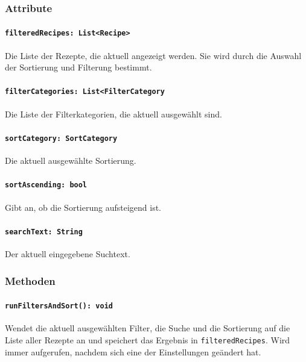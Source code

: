 \documentclass{entwurfsheft}
\begin{document}
\subsubsection*{Attribute}
\paragraph{\texttt{filteredRecipes: List<Recipe>}}
Die Liste der Rezepte, die aktuell angezeigt werden. Sie wird durch die Auswahl der Sortierung und Filterung bestimmt.
\paragraph{\texttt{filterCategories: List<FilterCategory}}
Die Liste der Filterkategorien, die aktuell ausgewählt sind.
\paragraph{\texttt{sortCategory: SortCategory}}
Die aktuell ausgewählte Sortierung.
\paragraph{\texttt{sortAscending: bool}}
Gibt an, ob die Sortierung aufsteigend ist.
\paragraph{\texttt{searchText: String}}
Der aktuell eingegebene Suchtext.
\subsubsection*{Methoden}
\paragraph{\texttt{runFiltersAndSort(): void}}
Wendet die aktuell ausgewählten Filter, die Suche und die Sortierung auf die Liste aller Rezepte an und speichert das Ergebnis in \texttt{filteredRecipes}. Wird immer aufgerufen, nachdem sich eine der Einstellungen geändert hat.
\newpage
\end{document}
